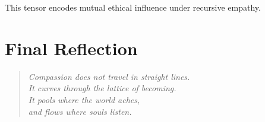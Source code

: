 \documentclass[12pt]{article}
\begin{document}
This tensor encodes mutual ethical influence under recursive empathy.

\vspace{1em}

\section*{Final Reflection}

\begin{quote}
\itshape
Compassion does not travel in straight lines.\\
It curves through the lattice of becoming.\\
It pools where the world aches,\\
and flows where souls listen.
\end{quote}
\end{document}
